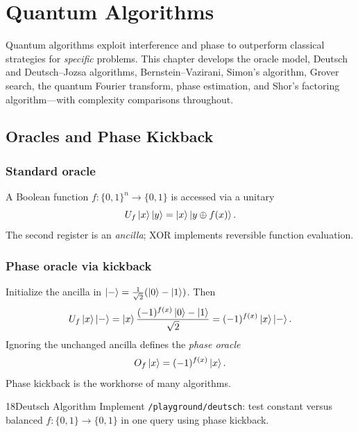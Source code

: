 \chapter{Quantum Algorithms}
\label{ch:algorithms}

Quantum algorithms exploit interference and phase to outperform classical strategies for \emph{specific} problems. This chapter develops the oracle model, Deutsch and Deutsch--Jozsa algorithms, Bernstein--Vazirani, Simon's algorithm, Grover search, the quantum Fourier transform, phase estimation, and Shor's factoring algorithm---with complexity comparisons throughout.

\section{Oracles and Phase Kickback}
\label{sec:oracle}

\subsection{Standard oracle}

A Boolean function $f:\{0,1\}^n\to\{0,1\}$ is accessed via a unitary
\begin{equation}
U_f\ket{x}\ket{y}=\ket{x}\ket{y\oplus f(x)}.
\label{eq:standard-oracle}
\end{equation}
The second register is an \emph{ancilla}; XOR implements reversible function evaluation.

\subsection{Phase oracle via kickback}

Initialize the ancilla in $\ket{-}=\frac{1}{\sqrt{2}}(\ket{0}-\ket{1})$. Then
\begin{equation}
U_f\ket{x}\ket{-}=\ket{x}\frac{(-1)^{f(x)}\ket{0}-\ket{1}}{\sqrt{2}}=(-1)^{f(x)}\ket{x}\ket{-}.
\label{eq:phase-kickback}
\end{equation}
Ignoring the unchanged ancilla defines the \emph{phase oracle}
\begin{equation}
O_f\ket{x}=(-1)^{f(x)}\ket{x}.
\label{eq:phase-oracle}
\end{equation}
Phase kickback is the workhorse of many algorithms.

\begin{labbox}{18}{Deutsch Algorithm}
Implement \texttt{/playground/deutsch}: test constant versus balanced $f:\{0,1\}\to\{0,1\}$ in one query using phase kickback.
\end{labbox}

